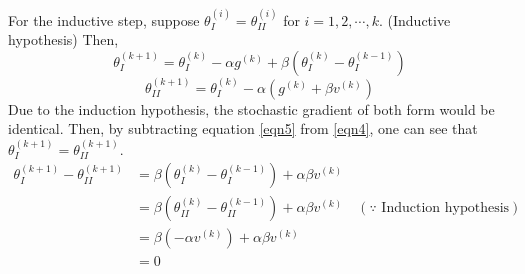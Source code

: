 \documentclass[10pt]{article}
\begin{document}
For the inductive step, suppose $\theta_I^{(i)} = \theta_{II}^{(i)}$ for $i = 1,2,\cdots, k$. (Inductive hypothesis)
Then,
\begin{equation}
    \theta_I^{(k+1)} = \theta_I^{(k)} - \alpha g^{(k)} + \beta \left(\theta_I^{(k)} - \theta_I^{(k-1)}\right)
    \label{eqn4}
\end{equation}
\begin{equation}
    \theta_{II}^{(k+1)} = \theta_I^{(k)} - \alpha \left(g^{(k)} + \beta v^{(k)}\right)
    \label{eqn5}
\end{equation}
Due to the induction hypothesis, the stochastic gradient of both form would be identical.
Then, by subtracting equation \ref{eqn5} from \ref{eqn4}, one can see that $\theta^{(k+1)}_I = \theta^{(k+1)}_{II}$.
\begin{align*}
    \theta_I^{(k+1)} - \theta_{II}^{(k+1)} &= \beta \left(\theta_I^{(k)} - \theta_{I}^{(k-1)}\right) + \alpha\beta v^{(k)} \\
    &= \beta\left(\theta_{II}^{(k)} - \theta_{II}^{(k-1)}\right) + \alpha\beta v^{(k)} \quad \left(\because \text{ Induction hypothesis}\right)\\
    &= \beta\left(-\alpha v^{(k)}\right) + \alpha\beta v^{(k)} \\
    &= 0 
\end{align*}
\end{document}
